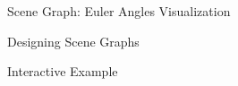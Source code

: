 \documentclass{beamer}
\begin{document}
\begin{frame}{Scene Graph: Euler Angles Visualization}

\end{frame}

\begin{frame}{Designing Scene Graphs}

Interactive Example

\end{frame}


\end{document}
